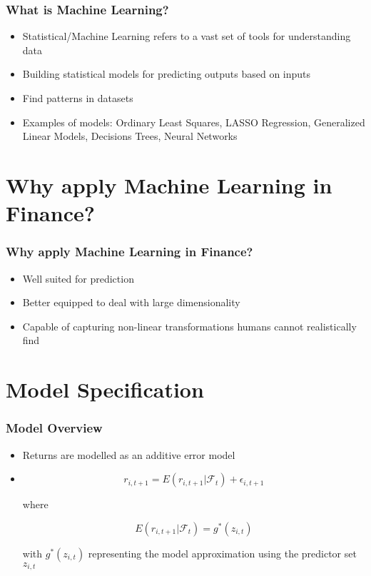 \documentclass{beamer}
\begin{document}
\begin{frame}
\frametitle{What is Machine Learning?}
\begin{itemize}
	\item Statistical/Machine Learning refers to a vast set of tools for understanding data
	\item Building statistical models for predicting outputs based on inputs
	\item Find patterns in datasets
	\item Examples of models: Ordinary Least Squares, LASSO Regression, Generalized Linear Models, Decisions Trees, Neural Networks
\end{itemize}
\end{frame}

\section{Why apply Machine Learning in Finance?}

\begin{frame}
\frametitle{Why apply Machine Learning in Finance?}
\begin{itemize}
	\item Well suited for prediction
	\item Better equipped to deal with large dimensionality
	\item Capable of capturing non-linear transformations humans cannot realistically find
\end{itemize}
\end{frame}

\section{Model Specification}

\begin{frame}
\frametitle{Model Overview}
\begin{itemize}
	\item Returns are modelled as an additive error model
	\item
		\begin{equation}
		r_{i, t+1} = E(r_{i, t+1} | \mathcal{F}_t) + \epsilon_{i, t+1}
		\end{equation}
		
		where 
		
		\begin{equation}
		E(r_{i, t+1} | \mathcal{F}_t) = g^*(z_{i,t})
		\end{equation}
		
		with $g^*(z_{i,t})$ representing the model approximation using the predictor set $z_{i,t}$
\end{itemize}
\end{frame}
\end{document}
